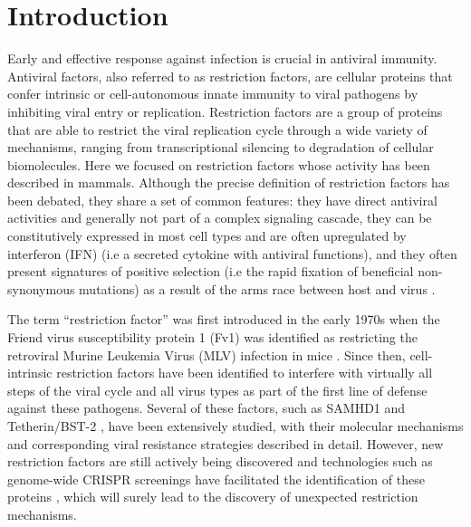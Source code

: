 \documentclass{enslyonreview}
\begin{document}

\maketitle

\section{Introduction}

Early and effective response against infection is crucial in antiviral immunity. Antiviral
factors, also referred to as restriction factors, are cellular proteins that confer intrinsic
or cell-autonomous innate immunity to viral pathogens by inhibiting viral entry or
replication. Restriction factors are a group of proteins that are able to restrict the viral
replication cycle through a wide variety of mechanisms, ranging from transcriptional
silencing to degradation of cellular biomolecules. Here we focused on restriction factors
whose activity has been described in mammals. Although the precise definition of restriction
factors has been debated, they share a set of common features: they have direct antiviral
activities and generally not part of a complex signaling cascade, they can be constitutively
expressed in most cell types and are often upregulated by interferon (IFN) (i.e a secreted
cytokine with antiviral functions), and they often present signatures of positive selection
(i.e the rapid fixation of beneficial non-synonymous mutations) as a result of the arms race
between host and virus \cite{blanco-meloIntrinsicCellularDefenses2012,klugeSnapShotAntiviralRestriction2015}.

The term ``restriction factor'' was first introduced in the early 1970s when the Friend virus
susceptibility protein 1 (Fv1) was identified as restricting the retroviral Murine Leukemia
Virus (MLV) infection in mice \cite{lillyFv2IdentificationLocation1970}. Since then, cell-intrinsic restriction factors
have been identified to interfere with virtually all steps of the viral cycle and all virus
types as part of the first line of defense against these pathogens. Several of these factors,
such as SAMHD1 \cite{cogginsSAMHD1FunctionsHuman2020} and Tetherin/BST-2 \cite{sauterCounteractionMultifunctionalRestriction2014}, have been extensively
studied, with their molecular mechanisms and corresponding viral resistance strategies
described in detail. However, new restriction factors are still actively being discovered and
technologies such as genome-wide CRISPR screenings have facilitated the identification of
these proteins \cite{wangGenomewideCRISPRScreenings2024}, which will surely lead to the discovery of unexpected
restriction mechanisms.
\end{document}
